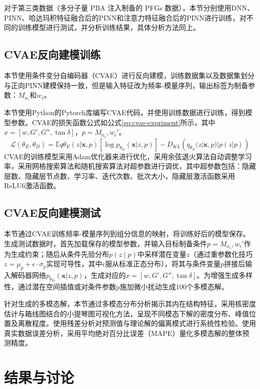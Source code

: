 对于第三类数据（多分子量 PBA 注入制备的 PFGs 数据），本节分别使用DNN、PINN、哈达玛积特征融合后的PINN和注意力特征融合后的PINN进行训练，对不同的训练模型进行测试，并分析训练结果，具体分析方法同上。

\subsection{CVAE反向建模训练}
本节使用条件变分自编码器（CVAE）进行反向建模，训练数据集以及数据集划分与正向PINN建模保持一致，但是输入特征改为频率-模量序列，输出标签为制备参数：$M_{n_i}$和$w_i$。

本节使用Python的Pytorch库编写CVAE代码，并使用训练数据进行训练，得到模型参数。CVAE的损失函数公式如公式\eqref{eq:cvae-expriment}所示，其中$x = [w, G', G'', \tan \delta]$，$p = { M_{n_i}, w_i }'$。
\begin{equation}
  \mathcal{L}(\theta_E, \theta_D) = \mathbb{E}{q{\theta_E}(z|\mathbf{x},p)} \left[ \log p_{\theta_D}(\mathbf{x}|z,p) \right] - D_{KL}\left(q_{\theta_E}(z|\mathbf{x},p) | p(z|p)\right) \label{eq:cvae-expriment}
\end{equation}
CVAE的训练模型采用Adam优化器来进行优化，采用余弦退火算法自动调整学习率，采用网格搜索算法和随机搜索算法对超参数进行调优，其中超参数包括：隐藏层数、隐藏层节点数、学习率、迭代次数、批次大小，隐藏层激活函数采用ReLU6激活函数。
\subsection{CVAE反向建模测试}
本节通过CVAE训练频率-模量序列到组分信息的映射，将训练好后的模型保存。生成测试数据时，首先加载保存的模型参数，并输入目标制备条件$p = { M_{n_i}, w_i }'$作为生成约束；随后从条件先验分布$p(z∣p)$中采样潜在变量$z$（通过重参数化技巧$z=\mu_p+\epsilon⋅\sigma_p$实现可导性，其中$\epsilon$服从标准正态分布），将其与条件变量$p$拼接后输入解码器网络$p_{\theta_D}(\mathbf{x}|z,p)$，生成对应的$x = [w, G', G'', \tan \delta]$。为增强生成多样性，通过潜在空间插值或对条件参数p施加微小扰动生成100个多模态解。

针对生成的多模态解，本节通过多模态分布分析揭示其内在结构特征，采用核密度估计与箱线图结合的小提琴图可视化方法，呈现不同模态下解的密度分布、峰值位置及离散程度。使用残差分析对预测值与理论解的偏离模式进行系统性检验。使用真实数据误差分析，采用平均绝对百分比误差（MAPE）量化多模态解的整体预测精度。
\section{结果与讨论}
